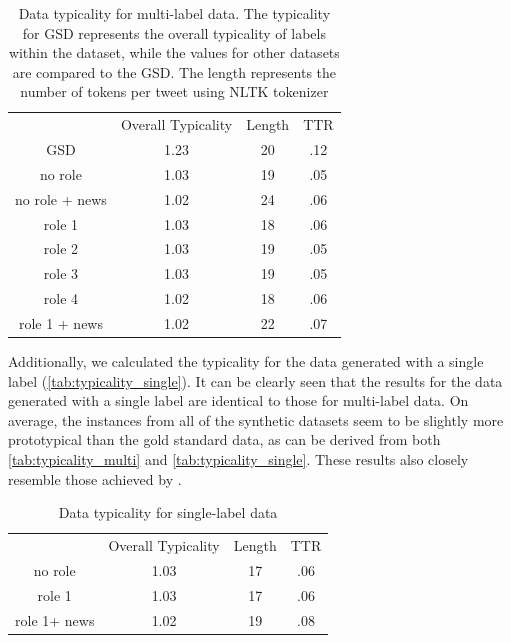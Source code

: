 \documentclass[manuscript]{clv3}
\begin{document}
\begin{table}
    \centering
    \begin{tabular}{cccc}
         & Overall Typicality  &Length&TTR\\
 GSD&1.23  &20&.12\\
         no role& 1.03  &19&.05\\
         no role + news& 1.02  &24&.06\\
         role 1& 1.03  &18&.06\\
         role 2& 1.03  &19&.05\\
         role 3& 1.03  &19&.05\\
         role 4& 1.02  &18&.06\\
         role 1 + news& 1.02  &22&.07\\
    \end{tabular}
    \caption{Data typicality for multi-label data. The typicality for GSD represents the overall typicality of labels within the dataset, while the values for other datasets are compared to the GSD. The length represents the number of tokens per tweet using NLTK tokenizer}
    \label{tab:typicality_multi}
\end{table}

Additionally, we calculated the typicality for the data generated with a single label (\autoref{tab:typicality_single}). It can be clearly seen that the results for the data generated with a single label are identical to those for multi-label data. On average, the instances from all of the synthetic datasets seem to be slightly more prototypical than the gold standard data, as can be derived from both \autoref{tab:typicality_multi} and \autoref{tab:typicality_single}. These results also closely resemble those achieved by \citet{van-nooten-daelemans-2023-improving}. 

\begin{table}
    \centering
    \begin{tabular}{cccc}
         & Overall Typicality  &Length&TTR\\
         no role& 1.03  &17&.06\\
         role 1& 1.03  &17&.06\\
         role 1+ news& 1.02  &19&.08\\
    \end{tabular}
    \caption{Data typicality for single-label data}
    \label{tab:typicality_single}
\end{table}
\end{document}
